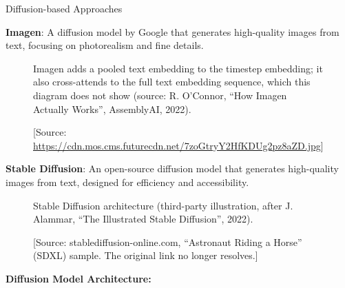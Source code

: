 \begin{frame}[allowframebreaks]{Diffusion-based Approaches}
\begin{figure}
    \end{figure}
\framebreak
    \textbf{Imagen}: A diffusion model by Google that generates high-quality images from text, focusing on photorealism and fine details.
    \begin{figure}
        \centering
        \caption*{Imagen adds a pooled text embedding to the timestep embedding; it also cross-attends to the full text embedding sequence, which this diagram does not show (source: R. O'Connor, ``How Imagen Actually Works'', AssemblyAI, 2022).}
    \end{figure}
\framebreak
    \begin{figure}
        \centering
        \caption*{\scriptsize [Source: \url{https://cdn.mos.cms.futurecdn.net/7zoGtryY2HfKDUg2pz8aZD.jpg}]}
    \end{figure}
\framebreak
    \textbf{Stable Diffusion}: An open-source diffusion model that generates high-quality images from text, designed for efficiency and accessibility.
    \begin{figure}
        \centering
        \caption*{Stable Diffusion architecture (third-party illustration, after J. Alammar, ``The Illustrated Stable Diffusion'', 2022).}
    \end{figure}
\framebreak
    \begin{figure}
        \centering
        \caption*{\scriptsize [Source: stablediffusion-online.com, ``Astronaut Riding a Horse'' (SDXL) sample. The original link no longer resolves.]}
    \end{figure}
\framebreak
    \textbf{Diffusion Model Architecture:}
    \begin{itemize}

\end{itemize}
\end{frame}
